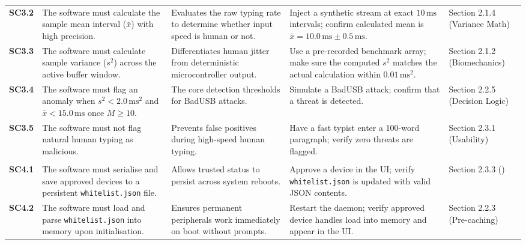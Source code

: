 {\begin{xltabular}{\textwidth}{@{} l P{3.0cm} L L P{2.2cm} @{}}
			\textbf{SC3.2} &
			The software must calculate the sample mean interval ($\bar{x}$) with high precision. &
			Evaluates the raw typing rate to determine whether input speed is human or not. &
			Inject a synthetic stream at exact $10\,\text{ms}$ intervals; confirm calculated mean is $\bar{x} = 10.0\,\text{ms} \pm 0.5\,\text{ms}$. &
			Section 2.1.4 (Variance Math) \\

			\textbf{SC3.3} &
			The software must calculate sample variance ($s^2$) across the active buffer window. &
			Differentiates human jitter from deterministic microcontroller output. &
			Use a pre-recorded benchmark array; make sure the computed $s^2$ matches the actual calculation within $0.01\,\text{ms}^2$. &
			Section 2.1.2 (Biomechanics) \\

			\textbf{SC3.4} &
			The software must flag an anomaly when $s^2 < 2.0\,\text{ms}^2$ and $\bar{x} < 15.0\,\text{ms}$ once $M \ge 10$. &
			The core detection thresholds for BadUSB attacks. &
			Simulate a BadUSB attack; confirm that a threat is detected. &
			Section 2.2.5 (Decision Logic) \\

			\textbf{SC3.5} &
			The software must not flag natural human typing as malicious. &
			Prevents false positives during high-speed human typing. &
			Have a fast typist enter a 100-word paragraph; verify zero threats are flagged. &
			Section 2.3.1 (Usability) \\
			\addlinespace[0.8em]

			 \\
			\midrule

			\textbf{SC4.1} &
			The software must serialise and save approved devices to a persistent \texttt{whitelist.json} file. &
			Allows trusted status to persist across system reboots. &
			Approve a device in the UI; verify \texttt{whitelist.json} is updated with valid JSON contents. &
			Section 2.3.3 (\stakeholdersPU) \\

			\textbf{SC4.2} &
			The software must load and parse \texttt{whitelist.json} into memory upon initialisation. &
			Ensures permanent peripherals work immediately on boot without prompts. &
			Restart the daemon; verify approved device handles load into memory and appear in the UI. &
			Section 2.2.3 (Pre-caching) \\


\end{xltabular}}
